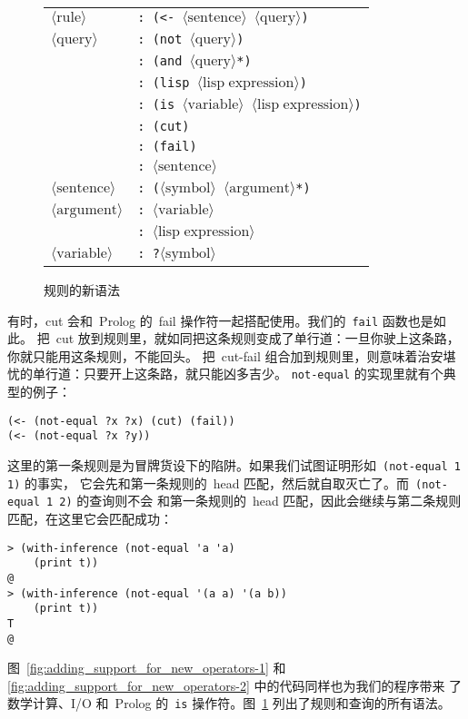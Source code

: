 \begin{figure}
  \begin{tabular}{ll}
    $\langle\mathrm{rule}\rangle$     & \texttt{: (<- $\langle\mathrm{sentence}\rangle$ $\langle\mathrm{query}\rangle$)} \\
    $\langle\mathrm{query}\rangle$    & \texttt{: (not $\langle\mathrm{query}\rangle$)} \\
                                      & \texttt{: (and $\langle\mathrm{query}\rangle$*)} \\
                                      & \texttt{: (lisp $\langle\mathrm{lisp\;expression}\rangle$)} \\
                                      & \texttt{: (is $\langle\mathrm{variable}\rangle$ $\langle\mathrm{lisp\;expression}\rangle$)} \\
                                      & \texttt{: (cut)} \\
                                      & \texttt{: (fail)} \\
                                      & \texttt{: $\langle\mathrm{sentence}\rangle$} \\
    $\langle\mathrm{sentence}\rangle$ & \texttt{: ($\langle\mathrm{symbol}\rangle$ $\langle\mathrm{argument}\rangle$*)} \\
    $\langle\mathrm{argument}\rangle$ & \texttt{: $\langle\mathrm{variable}\rangle$} \\
                                      & \texttt{: $\langle\mathrm{lisp\;expression}\rangle$} \\
    $\langle\mathrm{variable}\rangle$ & \texttt{: ?$\langle\mathrm{symbol}\rangle$}
  \end{tabular}
  \caption{规则的新语法}
  \label{fig:new_syntax_of_rules}
\end{figure}

有时，cut 会和~Prolog 的~fail 操作符一起搭配使用。我们的~\verb|fail| 函数也是如此。
把~cut 放到规则里，就如同把这条规则变成了单行道：一旦你驶上这条路，你就只能用这条规则，不能回头。
把~cut-fail 组合加到规则里，则意味着治安堪忧的单行道：只要开上这条路，就只能凶多吉少。
\verb|not-equal| 的实现里就有个典型的例子：
\begin{lstlisting}
(<- (not-equal ?x ?x) (cut) (fail))
(<- (not-equal ?x ?y))
\end{lstlisting}
这里的第一条规则是为冒牌货设下的陷阱。如果我们试图证明形如~\verb|(not-equal 1 1)| 的事实，
它会先和第一条规则的~head 匹配，然后就自取灭亡了。而~\verb|(not-equal 1 2)| 的查询则不会
和第一条规则的~head 匹配，因此会继续与第二条规则匹配，在这里它会匹配成功：
\begin{lstlisting}
> (with-inference (not-equal 'a 'a)
    (print t))
@
> (with-inference (not-equal '(a a) '(a b))
    (print t))
T
@
\end{lstlisting}
图~\ref{fig:adding_support_for_new_operators-1} 和 \ref{fig:adding_support_for_new_operators-2} 中的代码同样也为我们的程序带来
了数学计算、I/O 和~Prolog 的~\verb|is| 操作符。图~\ref{fig:new_syntax_of_rules} 列出了规则和查询的所有语法。


